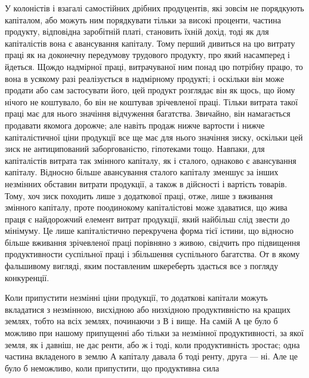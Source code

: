 У колоністів і взагалі самостійних дрібних продуцентів, які зовсім не
порядкують капіталом, або можуть ним порядкувати тільки за високі проценти,
частина продукту, відповідна заробітній платі, становить їхній дохід, тоді як
для капіталістів вона є авансування капіталу. Тому перший дивиться на цю
витрату праці як на доконечну передумову трудового продукту, про який насамперед
і йдеться. Щождо надмірної праці, витрачуваної ним понад цю потрібну
працю, то вона в усякому разі реалізується в надмірному продукті; і оскільки
він може продати або сам застосувати його, цей продукт розглядає він як
щось, що йому нічого не коштувало, бо він не коштував зрічевленої праці.
Тільки витрата такої праці має для нього значіння відчуження багатства. Звичайно,
він намагається продавати якомога дорожче; але навіть продаж нижче
вартости і нижче капіталістичної ціни продукції все ще має для нього значіння
зиску, оскільки цей зиск не антиципований заборгованістю, гіпотеками тощо.
Навпаки, для капіталістів витрата так змінного капіталу, як і сталого, однаково
є авансування капіталу. Відносно більше авансування сталого капіталу
зменшує за інших незмінних обставин витрати продукції, а також в дійсності і
вартість товарів. Тому, хоч зиск походить лише з додаткової праці, отже, лише
з вживання змінного капіталу, проте поодинокому капіталістові може здаватися,
що жива праця є найдорожчий елемент витрат продукції, який найбільш слід звести
до мінімуму. Це лише капіталістично перекручена форма тієї істини, що відносно
більше вживання зрічевленої праці порівняно з живою, свідчить про підвищення
продуктивности суспільної праці і збільшення суспільного багатства. От в якому фальшивому
вигляді, яким поставленим шкереберть здається все з погляду конкуренції.

Коли припустити незмінні ціни продукції, то додаткові капітали можуть
вкладатися з незмінною, висхідною або низхідною продуктивністю на кращих
землях, тобто на всіх землях, починаючи з В і вище. На самій А це було б
можливо при нашому припущенні або тільки за незмінної продуктивності, за
якої земля, як і давніш, не дає ренти, або ж і тоді, коли продуктивність зростає;
одна частина вкладеного в землю А капіталу давала б тоді ренту,
друга — ні. Але це було б неможливо, коли припустити, що продуктивна сила
\parbreak{}  %
